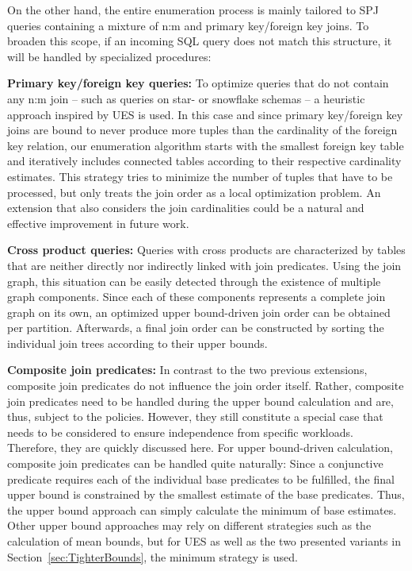On the other hand, the entire enumeration process is mainly tailored to SPJ queries containing a mixture of n:m and primary key/foreign key joins. 
To broaden this scope, if an incoming SQL query does not match this structure, it will be handled by specialized procedures:

\begin{compactitem}
    \item[\textbf{Primary key/foreign key queries:}] To optimize queries that do not contain any n:m join -- such as queries on star- or snowflake schemas -- a heuristic approach inspired by UES is used. In this case and since primary key/foreign key joins are bound to never produce more tuples than the cardinality of the foreign key relation, our enumeration algorithm starts with the smallest foreign key table and iteratively includes connected tables according to their respective cardinality estimates. This strategy tries to minimize the number of tuples that have to be processed, but only treats the join order as a local optimization problem. An extension that also considers the join cardinalities could be a natural and effective improvement in future work.
    \item[\textbf{Cross product queries:}] Queries with cross products are characterized by tables that are neither directly nor indirectly linked with join predicates. Using the join graph, this situation can be easily detected through the existence of multiple graph components. Since each of these components represents a complete join graph on its own, an optimized upper bound-driven join order can be obtained per partition. Afterwards, a final join order can be constructed by sorting the individual join trees according to their upper bounds.
    \item[\textbf{Composite join predicates:}] In contrast to the two previous extensions, composite join predicates do not influence the join order itself. Rather, composite join predicates need to be handled during the upper bound calculation and are, thus, subject to the policies. However, they still constitute a special case that needs to be considered to ensure independence from specific workloads. Therefore, they are quickly discussed here. For upper bound-driven calculation, composite join predicates can be handled quite naturally: Since a conjunctive predicate requires each of the individual base predicates to be fulfilled, the final upper bound is constrained by the smallest estimate of the base predicates. Thus, the upper bound approach can simply calculate the minimum of base estimates. Other upper bound approaches may rely on different strategies such as the calculation of mean bounds, but for UES as well as the two presented variants in Section~\ref{sec:TighterBounds}, the minimum strategy is used.
\end{compactitem}

